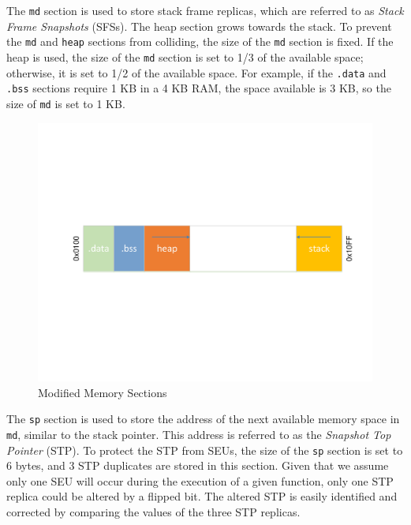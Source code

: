 The \texttt{md} section is used to store stack frame replicas, which are referred to as \textit{Stack Frame Snapshots} (SFSs). The heap section grows towards the stack. To prevent the \texttt{md} and \texttt{heap} sections from colliding, the size of the \texttt{md} section is fixed. If the heap is used, the size of the \texttt{md} section is set to 1/3 of the available space; otherwise, it is set to 1/2 of the available space. For example, if the \texttt{.data} and \texttt{.bss} sections require 1 KB in a 4 KB RAM, the space available is 3 KB, so the size of \texttt{md} is set to 1 KB.
\begin{figure}[h]
	\centering
	\includegraphics[scale=0.35]{figures/Memory_model_v2.pdf}
	\vspace{-5pt}
	\caption{Modified Memory Sections}
	\label{fig:modified_ram_map}
\end{figure}
The \texttt{sp} section is used to store the address of the next available memory space in \texttt{md}, similar to the stack pointer. This address is referred to as the \textit{Snapshot Top Pointer} (STP). To protect the STP from SEUs, the size of the \texttt{sp} section is set to 6 bytes, and 3 STP duplicates are stored in this section. Given that we assume only one SEU will occur during the execution of a given function, only one STP replica could be altered by a flipped bit. The altered STP is easily identified and corrected by comparing the values of the three STP replicas.
